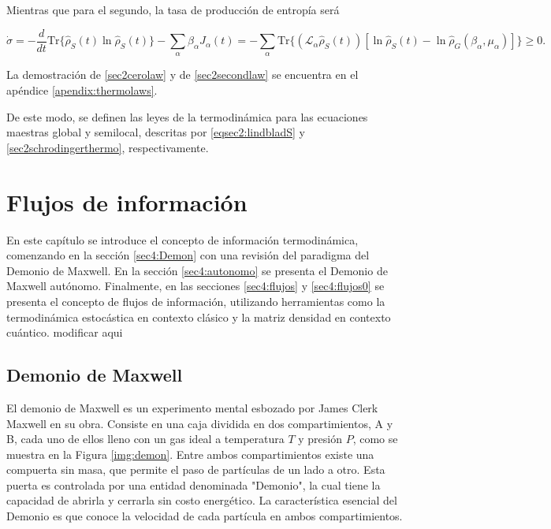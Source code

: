 Mientras que para el segundo, la tasa de producción de entropía será 

\begin{equation}
    \dot{\sigma} = - \frac{d}{dt}\text{Tr}\{\hat{\rho}_{S}(t) \ln \hat{\rho}_{S}(t) \} - \sum_{\alpha} \beta_{\alpha} J_{\alpha}(t) = -\sum_{\alpha} \text{Tr}\{(\mathcal{L}_{\alpha}\hat{\rho}_{S}(t))[\ln \hat{\rho}_{S}(t) - \ln \hat{\rho}_{G}(\beta_{\alpha},\mu_{\alpha})] \} \geq 0.
\label{sec2secondlaw}
\end{equation}

La demostración de \ref{sec2cerolaw} y de \ref{sec2secondlaw} se encuentra en el apéndice \ref{apendix:thermolaws}. 

De este modo, se definen las leyes de la termodinámica para las ecuaciones maestras global y semilocal, descritas por \ref{eqsec2:lindbladS} y \ref{sec2schrodingerthermo}, respectivamente.



\chapter{Flujos de información}
En este capítulo se introduce el concepto de información termodinámica, comenzando en la sección \ref{sec4:Demon} con una revisión del paradigma del Demonio de Maxwell. En la sección \ref{sec4:autonomo} se presenta el Demonio de Maxwell autónomo. Finalmente, en las secciones \ref{sec4:flujos} y \ref{sec4:flujos0} se presenta el concepto de flujos de información, utilizando herramientas como la termodinámica estocástica en contexto clásico y la matriz densidad en contexto cuántico\cite{horowitz2014thermodynamics,ptaszynski2019thermodynamics}.
modificar aqui

\section{Demonio de Maxwell}
El demonio de Maxwell es un experimento mental esbozado por James Clerk Maxwell en su obra\cite{Maxwell_1871}. Consiste en una caja dividida en dos compartimientos, A y B, cada uno de ellos lleno con un gas ideal a temperatura $T$ y presión $P$, como se muestra en la Figura \ref{img:demon}. Entre ambos compartimientos existe una compuerta sin masa, que permite el paso de partículas de un lado a otro. Esta puerta es controlada por una entidad denominada "Demonio", la cual tiene la capacidad de abrirla y cerrarla sin costo energético. La característica esencial del Demonio es que conoce la velocidad de cada partícula en ambos compartimientos. 

